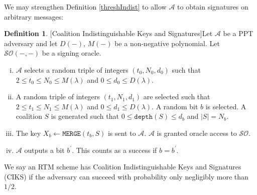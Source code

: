 \documentclass[12pt,english,oneside]{mrl}
\theoremstyle{definition}
\newtheorem{Defn}[lem]{Definition}
\newenvironment{defn}{\begin{Defn}\rm}{\end{Defn}}
\numberwithin{equation}{section}
\numberwithin{figure}{section}
\numberwithin{equation}{section}
\numberwithin{equation}{section}
\numberwithin{figure}{section}
\begin{document}


We may strengthen Definition \ref{threshIndist} to allow $\mathcal{A}$ to obtain signatures on arbitrary messages:

\begin{defn}[Coalition Indistinguishable Keys and Signatures]\label{threshIndistSigs} Let $\mathcal{A}$ be a PPT adversary and let $D(-)$, $M(-)$ be a non-negative polynomial. Let $\mathcal{SO}(-,-)$ be a signing oracle.
\begin{enumerate}[(i)]
\item $\mathcal{A}$ selects a random triple of integers $(t_0,N_0, d_0)$ such that $2 \leq t_0 \leq N_0 \leq M(\lambda)$ and $0 \leq d_0 \leq D(\lambda)$.
\item A random triple of integers $(t_1, N_1, d_1)$ are selected such that $2 \leq t_1 \leq N_1 \leq M(\lambda)$ and $0 \leq d_1 \leq D(\lambda)$. A random bit $b$ is selected. A coalition $S$ is generated such that $0 \leq\texttt{depth}(S) \leq d_b$ and $\left|S\right|=N_b$. 
\item The key $X_{b} \leftarrow \texttt{MERGE}(t_{b}, S)$ is sent to $\mathcal{A}$. $\mathcal{A}$ is granted oracle access to $\mathcal{SO}$.
\item $\mathcal{A}$ outputs a bit $b^{\prime}$. This counts as a success if $b=b^{\prime}$.
\end{enumerate}
We say an RTM scheme has Coalition Indistinguishable Keys and Signatures (CIKS) if the adversary can succeed with probability only negligibly more than $1/2$.
\end{defn}
\end{document}
